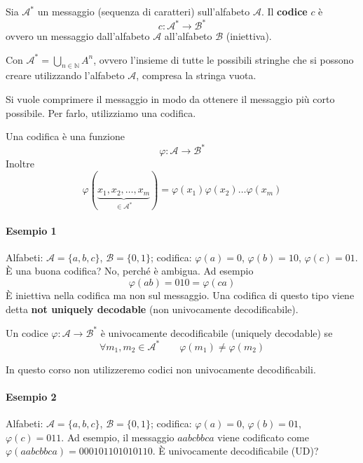 \begin{definition}[Codice]
    Sia $\mathcal{A}^*$ un messaggio (sequenza di caratteri) sull'alfabeto $\mathcal{A}$. Il \textbf{codice} $c$ è
    $$
        c:\mathcal{A}^*\to\mathcal{B}^*
    $$
    ovvero un messaggio dall'alfabeto $\mathcal{A}$ all'alfabeto $\mathcal{B}$ (iniettiva).
\end{definition}
Con $\mathcal{A}^*=\bigcup_{n\in\mathbb{N}}A^n$, ovvero l'insieme di tutte le possibili stringhe che si possono creare utilizzando l'alfabeto $\mathcal{A}$, compresa la stringa vuota.\medskip 

Si vuole comprimere il messaggio in modo da ottenere il messaggio più corto possibile. Per farlo, utilizziamo una codifica.
\begin{definition}[Codifica]
    Una codifica è una funzione 
    $$
        \varphi:\mathcal{A}\to\mathcal{B}^*
    $$ 
    Inoltre
    $$
        \varphi(\underbrace{x_1,x_2,\dots,x_m}_{\in\mathcal{A}^*}) = \varphi(x_1)\varphi(x_2)\dots\varphi(x_m)
    $$
\end{definition}

\paragraph{Esempio 1} Alfabeti: $\mathcal{A}=\{a,b,c\}$, $\mathcal{B}=\{0,1\}$; codifica: $\varphi(a)=0$, $\varphi(b)=10$, $\varphi(c)=01$. È una buona codifica? No, perché è ambigua. Ad esempio
$$
    \varphi(ab) = 010 = \varphi(ca)
$$
È iniettiva nella codifica ma non sul messaggio. Una codifica di questo tipo viene detta \textbf{not uniquely decodable} (non univocamente decodificabile).

\begin{definition}
    Un codice $\varphi:\mathcal{A}\to\mathcal{B}^*$ è univocamente decodificabile (uniquely decodable) se
    $$
        \forall m_1,m_2\in\mathcal{A}^* \qquad \varphi(m_1)\neq\varphi(m_2)
    $$
\end{definition}
In questo corso non utilizzeremo codici non univocamente decodificabili.

\paragraph{Esempio 2} Alfabeti: $\mathcal{A}=\{a,b,c\}$, $\mathcal{B}=\{0,1\}$; codifica: $\varphi(a)=0$, $\varphi(b)=01$, $\varphi(c)=011$. Ad esempio, il messaggio $aabcbbca$ viene codificato come $\varphi(aabcbbca)=000101101010110$. È univocamente decodificabile (UD)?

